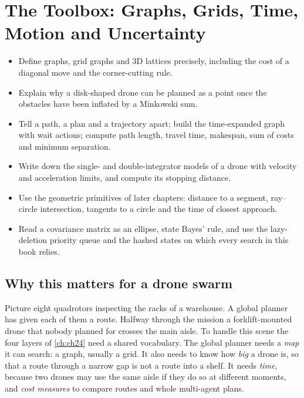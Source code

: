 \chapter{The Toolbox: Graphs, Grids, Time, Motion and Uncertainty}
\label{ch:ch02}

\begin{objectives}
\begin{itemize}
  \item Define graphs, grid graphs and 3D lattices precisely, including the cost of a diagonal move and the corner-cutting rule.
  \item Explain why a disk-shaped drone can be planned as a point once the obstacles have been inflated by a Minkowski sum.
  \item Tell a path, a plan and a trajectory apart; build the time-expanded graph with wait actions; compute path length, travel time, makespan, sum of costs and minimum separation.
  \item Write down the single- and double-integrator models of a drone with velocity and acceleration limits, and compute its stopping distance.
  \item Use the geometric primitives of later chapters: distance to a segment, ray--circle intersection, tangents to a circle and the time of closest approach.
  \item Read a covariance matrix as an ellipse, state Bayes' rule, and use the lazy-deletion priority queue and the hashed states on which every search in this book relies.
\end{itemize}
\end{objectives}

\section{Why this matters for a drone swarm}
\label{sec:ch02-motivation}

Picture eight quadrotors inspecting the racks of a warehouse. A global planner has given each of them a route. Halfway through the mission a forklift-mounted drone that nobody planned for crosses the main aisle. To handle this scene the four layers of \cref{ch:ch24} need a shared vocabulary. The global planner needs a \emph{map} it can search: a graph, usually a grid. It also needs to know how \emph{big} a drone is, so that a route through a narrow gap is not a route into a shelf. It needs \emph{time}, because two drones may use the same aisle if they do so at different moments, and \emph{cost measures} to compare routes and whole multi-agent plans.

